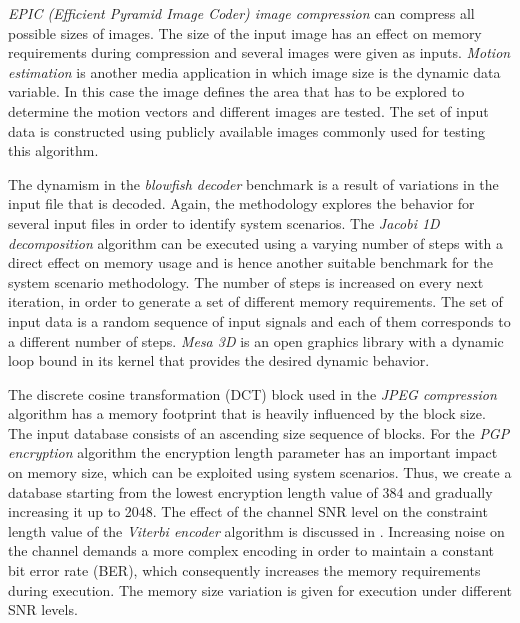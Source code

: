 \textit{EPIC (Efficient Pyramid Image Coder) image compression} can compress all possible sizes of images. 
The size of the input image has an effect on memory requirements during compression and several images were given as inputs. 
\textit{Motion estimation} is another media application in which image size is the dynamic data variable. 
In this case the image defines the area that has to be explored to determine the motion vectors and different images are tested. 
The set of input data is constructed using publicly available images commonly used for testing this algorithm.

The dynamism in the \textit{blowfish decoder} benchmark is a result of variations in the input file that is decoded. 
Again, the methodology explores the behavior for several input files in order to identify system scenarios. 
The \textit{Jacobi 1D decomposition} algorithm can be executed using a varying number of steps with a direct effect on memory usage and is hence another suitable benchmark for the system scenario methodology. 
The number of steps is increased on every next iteration, in order to generate a set of different memory requirements. 
The set of input data is a random sequence of input signals and each of them corresponds to a different number of steps.
\textit{Mesa 3D} is an open graphics library with a dynamic loop bound in its kernel that provides the desired dynamic behavior. 

The discrete cosine transformation (DCT)  block used in the \textit{JPEG compression} algorithm has a memory footprint that is heavily influenced by the block size. 
The input database consists of an ascending size sequence of blocks. 
For the \textit{PGP encryption} algorithm the encryption length parameter has an important impact on memory size, which can be exploited using system scenarios. 
Thus, we create a database starting from the lowest encryption length value of 384 and gradually increasing it up to 2048. 
The effect of the channel SNR level on the constraint length value of the \textit{Viterbi encoder} algorithm is discussed in \cite{Fil12}. 
Increasing noise on the channel demands a more complex encoding in order to maintain a constant bit error rate (BER), which consequently increases the memory requirements during execution. 
The memory size variation is given for execution under different SNR levels.  

